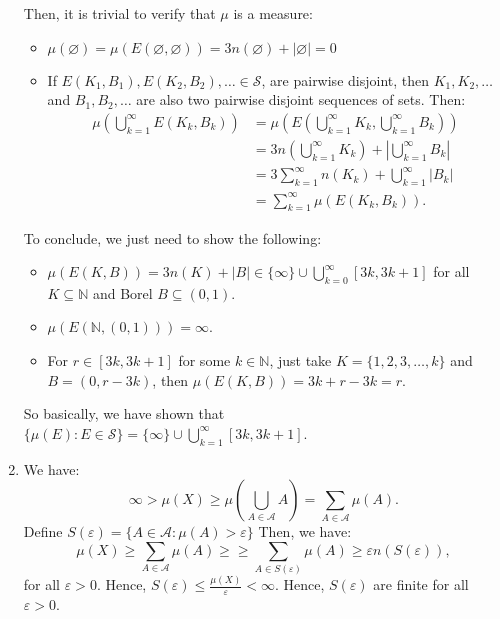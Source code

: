 \begin{enumerate}[label=\textbf{2C.\arabic*}]
  Then, it is trivial to verify that \( \mu  \) is a measure:
  \begin{itemize}
  \item \( \mu (\varnothing) = \mu (E(\varnothing, \varnothing)) =
    3n(\varnothing) + |\varnothing| = 0 \)
  \item If \( E(K_{1}, B_{1}), E(K_{2}, B_{2}), \ldots  \in \mathcal{S} \),
    are pairwise disjoint, then \( K_{1}, K_{2}, \ldots  \) and \( B_{1}, B_{2},
    \ldots \) are also two pairwise disjoint sequences of sets.
    Then:
    \begin{align*}
    \mu \left( \bigcup_{k = 1}^{\infty} E(K_{k}, B_{k}) \right) 
    &= \mu \left( E \left( \bigcup_{k = 1}^{\infty} K_{k}, \bigcup_{k =
    1}^{\infty} B_{k} \right)  \right)\\
    &= 3n \left( \bigcup_{k = 1}^{\infty} K_{k} \right) + \left| \bigcup_{k =
    1}^{\infty} B_{k} \right|   \\
    &= 3\sum_{k = 1}^{\infty} n(K_{k}) + \bigcup_{k = 1}^{\infty} |B_{k}|\\
    &= \sum_{k = 1}^{\infty} \mu (E(K_{k}, B_{k}))
    .\end{align*}
  \end{itemize}

  To conclude, we just need to show the following:
  \begin{itemize}
  \item \( \mu (E(K, B)) = 3n(K) + |B| \in \{\infty\} \cup \bigcup_{k =
    0}^{\infty} [3k, 3k + 1]  \) for all \( K \subseteq \mathbb{N} \) and Borel
    \( B \subseteq (0, 1) \).
  \item \( \mu (E(\mathbb{N}, (0, 1))) = \infty \).
  \item For \( r \in [3k, 3k + 1] \) for some \( k \in \mathbb{N} \), just take
    \( K = \{1, 2, 3, \ldots, k\}   \) and \( B = (0, r - 3k) \), then \( \mu
    (E(K, B)) = 3k + r - 3k = r \).
  \end{itemize}
  
  So basically, we have shown that \( \{\mu (E): E \in \mathcal{S}\} =
  \{\infty\} \cup \bigcup_{k = 1}^{\infty} [3k, 3k + 1]    \).

\item We have:
  \[
    \infty > \mu (X) \ge \mu \left( \bigcup_{A \in \mathcal{A}} A \right) =
    \sum_{A \in \mathcal{A}} \mu (A)
  .\] 
  Define \( S(\varepsilon) = \{A \in \mathcal{A}: \mu (A) > \varepsilon\}   \)
  Then, we have:
  \[
    \mu (X) \ge \sum_{A \in \mathcal{A}} \mu (A) \ge 
    \ge \sum_{A \in S(\varepsilon)} \mu (A) \ge \varepsilon n(S(\varepsilon))
  ,\] for all \( \varepsilon > 0 \).
  Hence, \( S(\varepsilon) \le \frac{\mu (X)}{\varepsilon} < \infty \). Hence,
  \( S(\varepsilon) \) are finite for all \( \varepsilon > 0 \).


\end{enumerate}
